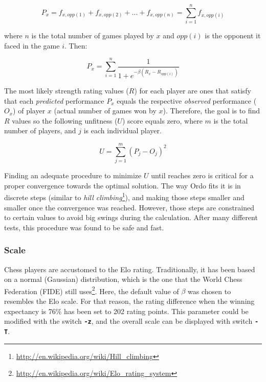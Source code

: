 \documentclass[12pt]{article}
\newcommand{\swtch} [1] {\texttt{\textbf{#1}}}
\begin{document}
	\begin{equation}
	P_{x} = f_{x,opp(1)} + f_{x,opp(2)} + ... + f_{x,opp(n)} = \sum\limits_{i=1}^n f_{x,opp(i)}
	\end{equation}

where $n$ is the total number of games played by $x$ and $opp(i)$ is the opponent it faced in the game $i$. Then:

	\begin{equation}
	P_{x} = \sum\limits_{i=1}^n \frac{1}{1 + e^{-\beta(R_{x}-R_{opp(i)})}}
	\end{equation}

The most likely strength rating values ($R$) for each player are ones that satisfy that each \textit{predicted} performance $P_{x}$ equals the respective \textit{observed} performance ($O_{x}$) of player $x$ (actual number of games won by $x$). 
Therefore, the goal is to find $R$ values so the following unfitness ($U$) score equals zero, where $m$ is the total number of players, and $j$ is each individual player.

	\begin{equation}
	U = \sum\limits_{j=1}^m (P_{j} - O_{j})^2
	\end{equation}

Finding an adequate procedure to minimize $U$ until reaches zero is critical for a proper convergence towards the optimal solution. 
The way Ordo fits it is in discrete steps (similar to \textit{hill climbing}\footnote{\url{http://en.wikipedia.org/wiki/Hill_climbing}}), and making those steps smaller and smaller once the convergence was reached. 
However, those steps are constrained to certain values to avoid big swings during the calculation.
After many different tests, this procedure was found to be safe and fast. 

\subsubsection*{Scale}

Chess players are accustomed to the Elo rating. 
Traditionally, it has been based on a normal (Gaussian) distribution, which is the one that the World Chess Federation (FIDE) still uses\footnote{\url{http://en.wikipedia.org/wiki/Elo_rating_system}}.
Here, the default value of $\beta$ was chosen to resembles the Elo scale.  
For that reason, the rating difference when the winning expectancy is 76\% has been set to 202 rating points.
This parameter could be modified with the switch \swtch{-z}, and the overall scale can be displayed with switch \swtch{-T}.
\end{document}
